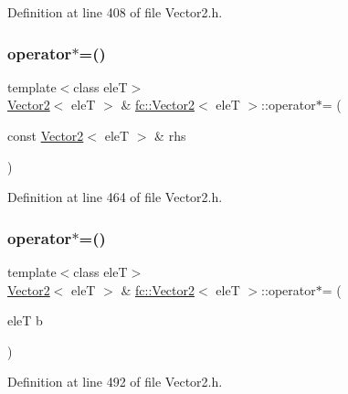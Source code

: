 Definition at line 408 of file Vector2.\+h.

\mbox{\label{classfc_1_1Vector2_acbc36b7ced69acf8fa5094e216bf45a7}} 
\subsubsection{\texorpdfstring{operator$\ast$=()}{operator*=()}\hspace{0.1cm}{\footnotesize\ttfamily [1/2]}}
{\footnotesize\ttfamily template$<$class eleT$>$ \\
\hyperlink{classfc_1_1Vector2}{Vector2}$<$ eleT $>$ \& \hyperlink{classfc_1_1Vector2}{fc\+::\+Vector2}$<$ eleT $>$\+::operator$\ast$= (\begin{DoxyParamCaption}\item[{const \hyperlink{classfc_1_1Vector2}{Vector2}$<$ eleT $>$ \&}]{rhs }\end{DoxyParamCaption})}



Definition at line 464 of file Vector2.\+h.

\mbox{\label{classfc_1_1Vector2_ae6933cec78beb94e5bea5bb82c8be583}} 
\subsubsection{\texorpdfstring{operator$\ast$=()}{operator*=()}\hspace{0.1cm}{\footnotesize\ttfamily [2/2]}}
{\footnotesize\ttfamily template$<$class eleT$>$ \\
\hyperlink{classfc_1_1Vector2}{Vector2}$<$ eleT $>$ \& \hyperlink{classfc_1_1Vector2}{fc\+::\+Vector2}$<$ eleT $>$\+::operator$\ast$= (\begin{DoxyParamCaption}\item[{eleT}]{b }\end{DoxyParamCaption})}



Definition at line 492 of file Vector2.\+h.

\mbox{\label{classfc_1_1Vector2_a9d656278089d6b2da7bdae8a1112551d}} 

